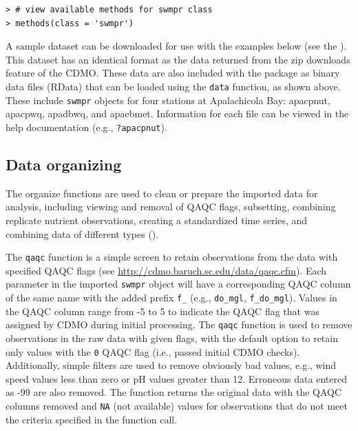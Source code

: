 \documentclass[10pt,letterpaper]{article}\usepackage[]{graphicx}\usepackage[]{color}
\makeatletter
\newenvironment{kframe}{%
 \def\at@end@of@kframe{}%
 \ifinner\ifhmode%
  \def\at@end@of@kframe{\end{minipage}}%
  \begin{minipage}{\columnwidth}%
 \fi\fi%
 \def\FrameCommand##1{\hskip\@totalleftmargin \hskip-\fboxsep
 \colorbox{shadecolor}{##1}\hskip-\fboxsep
     \hskip-\linewidth \hskip-\@totalleftmargin \hskip\columnwidth}%
 \MakeFramed {\advance\hsize-\width
   \@totalleftmargin\z@ \linewidth\hsize
   \@setminipage}}%
 {\par\unskip\endMakeFramed%
 \at@end@of@kframe}
\newenvironment{knitrout}{}{} %
\makeatother
\begin{document}
\begin{knitrout}\small
{}\color{fgcolor}\begin{kframe}
\begin{verbatim}
> # view available methods for swmpr class
> methods(class = 'swmpr')
\end{verbatim}
\end{kframe}
\end{knitrout}

A sample dataset can be downloaded for use with the examples below (see the ).  This dataset has an identical format as the data returned from the zip downloads feature of the \gls{CDMO}.  These data are also included with the package as binary data files (RData) that can be loaded using the \texttt{data} function, as shown above.  These include \texttt{swmpr} objects for four stations at Apalachicola Bay: apacpnut, apacpwq, apadbwq, and apaebmet.  Information for each file can be viewed in the help documentation (e.g., \texttt{?apacpnut}).

\subsection*{Data organizing}

The organize functions are used to clean or prepare the imported data for analysis, including viewing and removal of QAQC flags, subsetting, combining replicate nutrient observations, creating a standardized time series, and combining data of different types ().

The \texttt{qaqc} function is a simple screen to retain observations from the data with specified \gls{QAQC} flags (see \url{http://cdmo.baruch.sc.edu/data/qaqc.cfm}). Each parameter in the imported \texttt{swmpr} object will have a corresponding \gls{QAQC} column of the same name with the added prefix \texttt{f\_} (e.g., \texttt{do\_mgl}, \texttt{f\_do\_mgl}).  Values in the \gls{QAQC} column range from -5 to 5 to indicate the \gls{QAQC} flag that was assigned by \gls{CDMO} during initial processing.  The \texttt{qaqc} function is used to remove observations in the raw data with given flags, with the default option to retain only values with the \texttt{0} \gls{QAQC} flag (i.e., passed initial \gls{CDMO} checks).     Additionally, simple filters are used to remove obviously bad values, e.g., wind speed values less than zero or pH values greater than 12. Erroneous data entered as -99 are also removed. The function returns the original data with the \gls{QAQC} columns removed and \texttt{NA} (not available) values for observations that do not meet the criteria specified in the function call.
\end{document}
